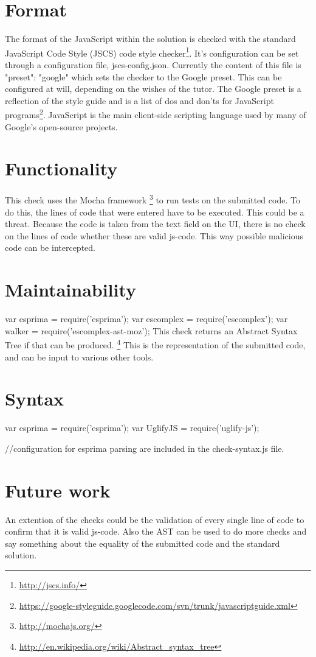 % 


\section{Format}

The format of the JavaScript within the solution is checked with the standard
JavaScript Code Style (JSCS) code style checker\footnote{\url{http://jscs.info/}}.
It's configuration can be set through a configuration file, jscs-config.json.
Currently the content of this file is {"preset": "google"} which sets the checker
to the Google preset.
This can be configured at will, depending on the wishes of the tutor.
The Google preset is a reflection of the style guide and is a list of dos and
don'ts for JavaScript
programs\footnote{\url{https://google-styleguide.googlecode.com/svn/trunk/javascriptguide.xml}}.
JavaScript is the main client-side scripting language used by many of Google's
open-source projects.


\section{Functionality}

This \gls{check} uses the Mocha framework \footnote{\url{http://mochajs.org/}} to run tests on the submitted code.
To do this, the lines of code that were entered have to be executed.
This could be a threat.
Because the code is taken from the text field on the UI, there is no check
on the lines of code whether these are valid \gls{js-code}.
This way possible malicious code can be intercepted.


\section{Maintainability}
var esprima = require('esprima');
var escomplex = require('escomplex');
var walker = require('escomplex-ast-moz');
This \gls{check} returns an Abstract Syntax Tree if that can be produced.
\footnote{\url{http://en.wikipedia.org/wiki/Abstract_syntax_tree}}
This is the representation of the submitted code, and can be input to various other tools.

\section{Syntax}
var esprima = require('esprima');
var UglifyJS = require('uglify-js');

//configuration for esprima parsing are included in the check-syntax.js file.


\section{Future work}
An extention of the \glspl{check} could be the validation of
every single line of code to confirm that it is valid \gls{js-code}.
Also the AST can be used to do more \glspl{check} and say something about the
equality of the submitted code and the standard solution.
